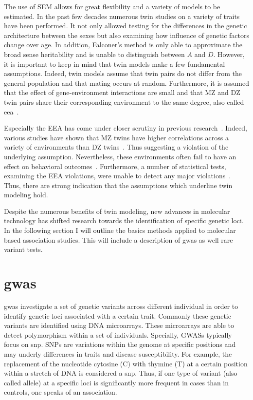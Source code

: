 The use of SEM allows for great flexibility and a variety of models to be estimated.
In the past few decades numerous twin studies on a variety of traits have been performed.
It not only allowed testing for the differences in the genetic architecture between the sexes but also examining how influence of genetic factors change over age.
In addition, Falconer's method is only able to approximate the broad sense heritability and is unable to distinguish between $A$ and $D$.
However, it is important to keep in mind that twin models make a few fundamental assumptions.
Indeed, twin models assume that twin pairs do not differ from the general population and that mating occurs at random.
Furthermore, it is assumed that the effect of gene-environment interactions are small and that MZ and DZ twin pairs share their corresponding environment to the same degree, also called \acrfull{eea}~\cite{Rijsdijk2002}.

Especially the EEA has come under closer scrutiny in previous research~\cite{Martin1997}. 
Indeed, various studies have shown that MZ twins have higher correlations across a variety of environments than DZ twins~\cite{Loehlin1976}.
Thus suggesting a violation of the underlying assumption.
Nevertheless, these environments often fail to have an effect on behavioral outcomes~\cite{Lytton1977}.
Furthermore, a number of statistical tests, examining the EEA violations, were unable to detect any major violations~\cite{Rijsdijk2002,Tuvblad2011a,Freitag2010,Derks2006}.
Thus, there are strong indication that the assumptions which underline twin modeling hold.

Despite the numerous benefits of twin modeling, new advances in molecular technology has shifted research towards the identification of specific genetic loci.
In the following section I will outline the basics methods applied to molecular based association studies.
This will include a description of \acrfull{gwas} as well rare variant tests.

\section{\acrfull{gwas}}
\label{sec:gwas}

\acrfull{gwas} investigate a set of genetic variants across different individual in order to identify genetic loci associated with a certain trait.
Commonly these genetic variants are identified using DNA microarrays.
These microarrays are able to detect polymorphism within a set of individuals.
Specially, GWASs typically focus on \acrfull{snp}.
SNPs are variations within the genome at specific positions and may underly differences in traits and disease susceptibility. 
For example, the replacement of the nucleotide cytosine (C) with thymine (T) at a certain position within a stretch of DNA is considered a \acrfull{snp}.
Thus, if one type of variant (also called allele) at a specific loci is significantly more frequent in cases than in controls, one speaks of an association.  

